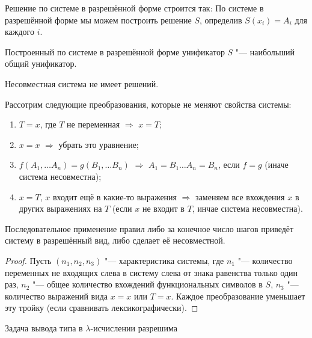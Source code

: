Решение по системе в разрешённой форме строится так:
По системе в разрешённой форме мы можем построить решение $S$, определив $S(x_i) = A_i$ для каждого $i$.
\todo

\begin{statement}
    Построенный по системе в разрешённой форме унификатор $S$ "--- наибольший общий унификатор.
\end{statement}

\begin{statement}
    Несовместная система не имеет решений.
\end{statement}

Рассотрим следующие преобразования, которые не меняют свойства системы: \todo
\begin{enumerate}[label=(\asbuk*)]
    \item $T=x$, где $T$ не переменная $\Rightarrow$ $x=T$;
    \item $x=x$ $\Rightarrow$ убрать это уравнение;
    \item $f(A_1, \ldots A_n) = g(B_1, \ldots B_n)$ $\Rightarrow$ $ A_1 = B_1 \ldots A_n = B_n$, если $f = g$ (иначе система несовместна);
    \item $x=T$, $x$ входит ещё в какие-то выражения $\Rightarrow$ заменяем все вхождения $x$ в других выражениях на $T$
        (если $x$ не входит в $T$, инчае система несовместна).
\end{enumerate}

\begin{statement}
    Последовательное применение правил либо за конечное число шагов приведёт систему в разрешённый вид, либо сделает её несовместной.
\end{statement}

\begin{proof} \todo
    Пусть $(n_1, n_2, n_3)$ "--- характеристика системы, где
    $n_1$ "--- количество переменных не входящих слева в систему слева от знака равенства только один раз,
    $n_2$ "--- общее количество вхождений функциональных символов в $S$,
    $n_3$ "--- количество выражений вида $x=x$ или $T=x$.
    Каждое преобразование уменьшает эту тройку (если сравнивать лексикографически).
\end{proof}

\begin{theorem}
    Задача вывода типа в $\lambda$-исчислении разрешима
\end{theorem}

